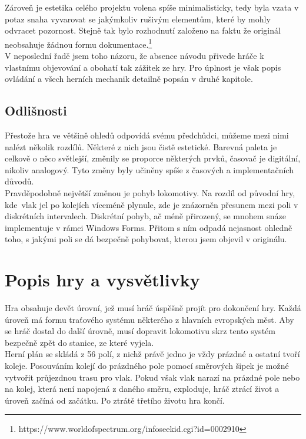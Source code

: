 \documentclass[11pt,a4paper]{scrreprt}
\begin{document}
Zároveň je estetika celého projektu volena spíše minimalisticky, tedy byla vzata v potaz snaha vyvarovat se jakýmkoliv rušivým elementům, které by mohly odvracet pozornost. Stejně tak bylo rozhodnutí založeno na faktu že originál neobsahuje žádnou formu dokumentace.\footnote{https://www.worldofspectrum.org/infoseekid.cgi?id=0002910}\\

V neposlední řadě jsem toho názoru, že absence návodu přivede hráče k vlastnímu objevování a obohatí tak zážitek ze hry. Pro úplnost je však popis ovládání a všech herních mechanik detailně popsán v druhé kapitole.

\section{Odlišnosti}
Přestože hra ve většině ohledů odpovídá svému předchůdci, můžeme mezi nimi nalézt několik rozdílů. Některé z nich jsou čistě estetické. Barevná paleta je celkově o něco světlejší, změnily se proporce některých prvků, časovač je digitální, nikoliv analogový. Tyto změny byly učiněny spíše z časových a implementačních důvodů.\\

Pravděpodobně největší změnou je pohyb lokomotivy. Na rozdíl od původní hry, kde~vlak jel po kolejích víceméně plynule, zde je znázorněn přesunem mezi poli v diskrétních intervalech. Diskrétní pohyb, ač méně přirozený, se mnohem snáze implementuje v rámci Windows Forms. Přitom s ním odpadá nejasnost ohledně toho, s jakými poli se dá bezpečně pohybovat, kterou jsem objevil v originálu.

\chapter{Popis hry a vysvětlivky}
Hra obsahuje devět úrovní, jež musí hráč úspěšně projít pro dokončení hry. Každá úroveň má formu traťového systému některého z hlavních evropských měst. Aby se hráč dostal do další úrovně, musí dopravit lokomotivu skrz tento systém bezpečně zpět do stanice, ze které vyjela.\\

Herní plán se skládá z 56 polí, z nichž právě jedno je vždy prázdné a ostatní tvoří koleje. Posouváním kolejí do prázdného pole pomocí směrových šipek je možné vytvořit průjezdnou trasu pro vlak. Pokud však vlak narazí na prázdné pole nebo na kolej, která není napojená z daného směru, exploduje, hráč ztrácí život a úroveň začíná od začátku. Po ztrátě třetího životu hra končí.\\
\end{document}
